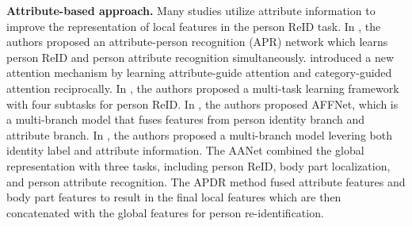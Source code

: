 \documentclass[final]{cvpr}
\begin{document}
\textbf{Attribute-based approach.} Many studies utilize attribute information to improve the representation of local features in the person ReID task. In \cite{attreid}, the authors proposed an attribute-person recognition (APR) network which learns person ReID and person attribute recognition simultaneously.  \cite{a3m} introduced a new attention mechanism by learning attribute-guide attention and category-guided attention reciprocally. In \cite{ling2019improving}, the authors proposed a multi-task learning framework with four subtasks for person ReID. In \cite{affnet}, the authors proposed AFFNet, which is a multi-branch model that fuses features from person identity branch and attribute branch. In \cite{PAAN}, the authors proposed a multi-branch model levering both identity label and attribute information. The AANet \cite{aanet} combined the global representation with three tasks, including person ReID, body part localization, and person attribute recognition. The APDR \cite{apdr} method fused attribute features and body part features to result in the final local features which are then concatenated with the global features for person re-identification.
\end{document}
